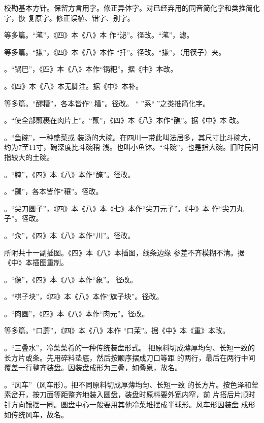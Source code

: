 校勘基本方针。保留方言用字。修正异体字。对已经弃用的同音简化字和类推简化字，恢
复原字。修正误植、错字、别字。

\null%

等多篇。“滗”，《四》本《八》本
作“泌”。径改。“滗”，滤。

等多篇。“搛”，《四》本《八》本作
“扦”。径改。“搛”，（用筷子）夹。

。“锅巴”，《四》本《八》本作“锅粑”。据《中》本改。

。《四》本《八》本无脚注{\footnotesize{}}。据《中》本补。

等多篇。“醪糟”，各本皆作“𰪿糟”。径改。
“𰪿”系“𫃑”之类推简化字。

。“使全部蘸裹在肉片上”。“蘸”，《四》本《八》本作“醮”。据《中》本
改。

。“鱼碗”，一种盛菜或
装汤的大碗。在四川一带此叫法居多，其尺寸比斗碗大，约为7至11寸，碗深度比斗碗稍
浅。也叫小鱼钵。“斗碗”，也是指大碗。旧时民间指较大的土碗。

。“腌”，《四》本《八》本作“醃”。径改。

。“瓤”，各本皆作“穰”。径改。

。“尖刀圆子”，《四》本《八》本《七》本作“尖刀元子”。《中》本
作“尖刀丸子”。径改。

。“汆”，《四》本《八》本作“川”。径改。

所附共十一副插图。《四》本《八》本插图，线条边缘
参差不齐模糊不清。据《中》本插图重制。

。“像”，\null《四》本《八》本作“象”。
径改。

。“棋子块”，《四》本《八》本作“旗子块”。径改。

。“肉圆”，《四》本《八》本作“肉元”。径改。

等多篇。“口蘑”，《四》本《八》本作
“口茉”。据《中》本《重》本改。

。“三叠水”，冷菜菜肴的一种传统装盘形式。
把原料切成薄厚均匀、长短一致的长方片或条。先用碎料垫底，然后按顺序摆成刀口等距
的两行，最后在两行中间覆盖一行整齐装盘。因装盘成形为三叠，如叠泉，故名。

。“风车”（风车形）。把不同原料切成厚薄均匀、长短一致
的长方片。按色泽和荤素岔开，按刀面等距整齐地装入圆盘，装盘时原料要外宽内窄，前
片搭后片顺时针方向镶摆一圈。圆盘中心一般要用其他冷菜堆摆成半球形。风车形因装盘
成形如传统风车，故名。

